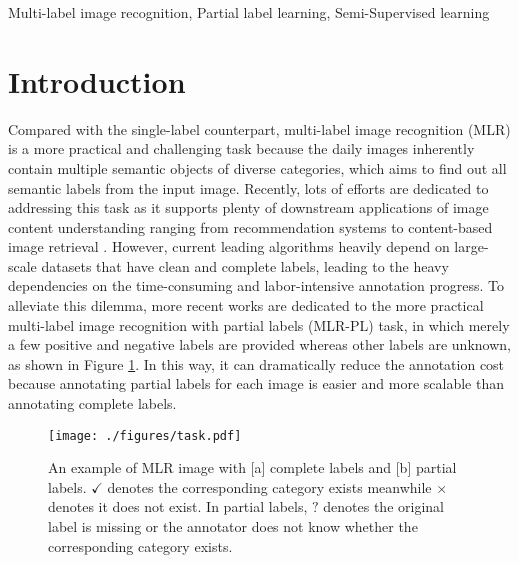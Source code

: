 \documentclass[lettersize,journal]{IEEEtran}
\begin{document}
\begin{IEEEkeywords}
Multi-label image recognition, Partial label learning, Semi-Supervised learning
\end{IEEEkeywords}

\section{Introduction} \label{sec:intro}
Compared with the single-label counterpart, multi-label image recognition (MLR) is a more practical and challenging task because the daily images inherently contain multiple semantic objects of diverse categories, which aims to find out all semantic labels from the input image. Recently, lots of efforts \cite{sun2014multi, gao2021learning, Li2021T-CYB, Zhang2020T-CYB, Liu2017T-CYB} are dedicated to addressing this task as it supports plenty of downstream applications of image content understanding ranging from recommendation systems \cite{Carrillo2013Multi, Zheng2014Context, Fu2022T-CYB} to content-based image retrieval \cite{Li2010Technique, Zhang2021Instance, lai2016instance, shen2021deep_tmm}. However, current leading algorithms \cite{Wu2020AdaHGNN, Chen2022KGGR, Chen2021P-GCN} heavily depend on large-scale datasets that have clean and complete labels, leading to the heavy dependencies on the time-consuming and labor-intensive annotation progress. To alleviate this dilemma, more recent works \cite{Durand2019CVPR, Chen2022SST, Pu2022SARB, Pu2022MLR-PPL} are dedicated to the more practical multi-label image recognition with partial labels (MLR-PL) task, in which merely a few positive and negative labels are provided whereas other labels are unknown, as shown in Figure \ref{fig:task}. In this way, it can dramatically reduce the annotation cost because annotating partial labels for each image is easier and more scalable than annotating complete labels.

\begin{figure}[!t] 
  \centering
  \texttt{[image: ./figures/task.pdf]}
  \caption{An example of MLR image with  [a] complete labels and [b] partial labels. $\checkmark$ denotes the corresponding category exists meanwhile $\times$ denotes it does not exist. In partial labels, {\color{red} $\textbf{?}$} denotes the original label is missing or the annotator does not know whether the corresponding category exists.}     
  \label{fig:task}     
\end{figure}
\end{document}
